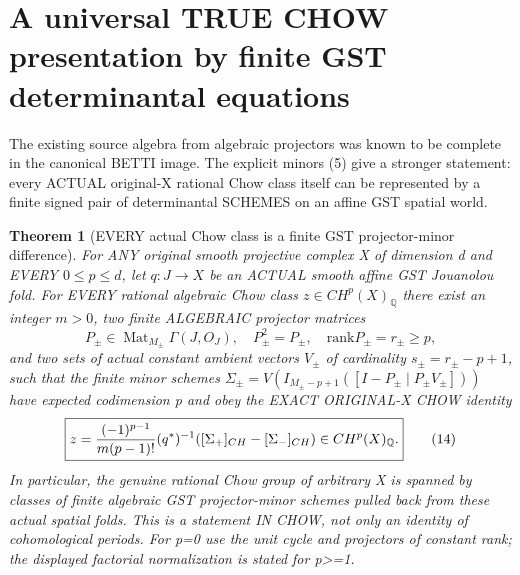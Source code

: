 \documentclass[11pt]{article}
\newtheorem{theorem}{Theorem}[section]
\begin{document}
\section{A universal TRUE CHOW presentation by finite GST determinantal equations}
The existing source algebra
from algebraic projectors was
known to be complete in
the canonical BETTI image.
The explicit minors (5)
give a stronger statement:
every ACTUAL original-X
rational Chow class itself
can be represented by a
finite signed pair of
determinantal SCHEMES on
an affine GST spatial world.

\begin{theorem}[EVERY actual Chow class is a finite GST projector-minor difference]
For ANY original smooth
projective complex X of
dimension d and EVERY
$0\le p\le d$, let
$q:J\to X$ be an ACTUAL
smooth affine
GST Jouanolou fold.
For EVERY rational
algebraic Chow class
$z\in CH^p(X)_{\mathbb Q}$
there exist an integer
$m>0$, two finite
ALGEBRAIC projector
matrices
\[
 P_\pm\in
 \operatorname{Mat}_{M_\pm}
             \Gamma(J,O_J),
 \quad P_\pm^2=P_\pm,
 \quad\mathrm{rank}P_\pm=r_\pm\ge p,
\]
and two sets of actual
constant ambient vectors
$V_\pm$ of cardinality
$s_\pm=r_\pm-p+1$,
such that the finite
minor schemes
$\Sigma_\pm=
V(I_{M_\pm-p+1}
([I-P_\pm\mid P_\pm V_\pm]))$
have expected
codimension p and obey
the EXACT ORIGINAL-X
CHOW identity
\[
 \boxed{
 z=
 {(-1)^{p-1}\over m(p-1)!}
 (q^*)^{-1}
       ([\Sigma_+]_{CH}
                -[\Sigma_-]_{CH})
 \in CH^p(X)_{\mathbb Q}.
 }                                                     \tag{14}
\]
In particular, the
genuine rational Chow
group of arbitrary X
is spanned by classes
of finite algebraic
GST projector-minor
schemes pulled back
from these actual
spatial folds.
This is a statement
IN CHOW, not only
an identity of
cohomological periods.
For p=0 use the unit
cycle and projectors
of constant rank;
the displayed
factorial normalization
is stated for p>=1.
\end{theorem}
\end{document}
